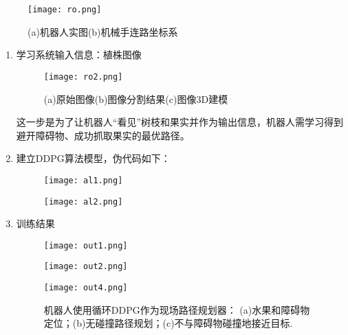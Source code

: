 \documentclass[12pt]{article}
\begin{document}
\begin{figure}[htbp]
	\centering
	\texttt{[image: ro.png]}
	\caption{(a)机器人实图(b)机械手连路坐标系}
\end{figure}

\begin{enumerate}
	\item 学习系统输入信息：植株图像
	\begin{figure}[htbp]
		\centering
		\texttt{[image: ro2.png]}
		\caption{(a)原始图像(b)图像分割结果(c)图像3D建模}
	\end{figure}
	这一步是为了让机器人“看见”树枝和果实并作为输出信息，机器人需学习得到避开障碍物、成功抓取果实的最优路径。
	\item 建立DDPG算法模型，伪代码如下：
	\begin{figure}[htbp]
		\centering
		\texttt{[image: al1.png]}
	\end{figure}
	\begin{figure}[htbp]
		\centering
		\texttt{[image: al2.png]}
	\end{figure}
	\item 训练结果
	\begin{figure}[htbp]
		\centering
		\texttt{[image: out1.png]}
	\end{figure}
	\begin{figure}[htbp]
		\centering
		\texttt{[image: out2.png]}
	\end{figure}
	\begin{figure}[htbp]
		\centering
		\texttt{[image: out4.png]}
		\caption{机器人使用循环DDPG作为现场路径规划器： (a)水果和障碍物定位；(b)无碰撞路径规划；(c)不与障碍物碰撞地接近目标.}
	\end{figure}
\end{enumerate}





\end{document}
